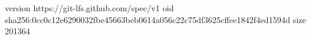 version https://git-lfs.github.com/spec/v1
oid sha256:0cc0c12e6290032fbe45663beb0614a056c22c75df3625cffee1842f4ed1594d
size 201364
